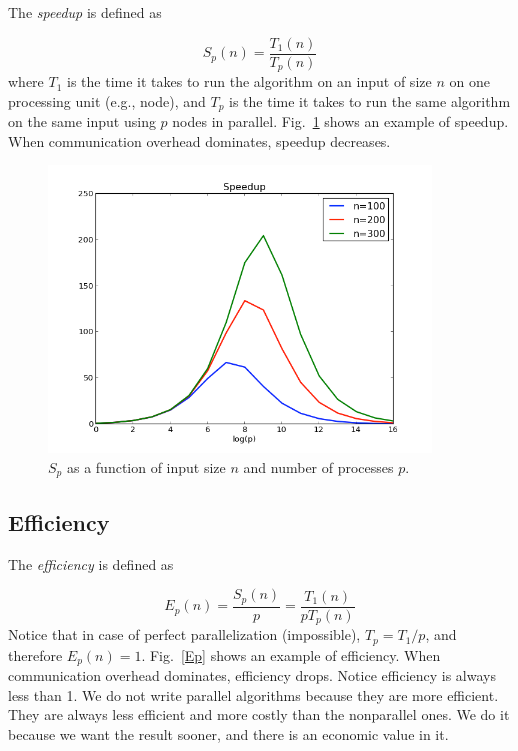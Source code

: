 \documentclass[justified,sixbynine]{tufte-book}
\theoremstyle{plain}%
\theoremstyle{definition}
\theoremstyle{remark}
\begin{document}
\begin{fullwidth}
The {\it speedup} is defined as

\begin{equation}
S_p(n) = \frac{T_1(n)}{T_p(n)}
\end{equation}
where $T_1$ is the time it takes to run the algorithm on an input of size $n$ on one processing unit (e.g., node), and $T_p$ is the time it takes to run the same algorithm on the same input using $p$ nodes in parallel. Fig.~\ref{Sp} shows an example of speedup. When communication overhead dominates, speedup decreases.

\begin{figure}[ht]
\centering\includegraphics[width=4in]{images/Sp.png}
\caption{$S_p$ as a function of input size $n$ and number of processes $p$.\label{Sp}}
\end{figure}

\goodbreak\subsection{Efficiency}

The {\it efficiency} is defined as

\begin{equation}
E_p(n) = \frac{S_p(n)}{p} = \frac{T_1(n)}{p T_p(n)}
\end{equation}
Notice that in case of perfect parallelization (impossible), $T_p=T_1/p$, and therefore $E_p(n)=1$. Fig.~\ref{Ep} shows an example of efficiency. When communication overhead dominates, efficiency drops. Notice efficiency is always less than 1. We do not write parallel algorithms because they are more efficient. They are always less efficient and more costly than the nonparallel ones. We do it because we want the result sooner, and there is an economic value in it.


\end{fullwidth}
\end{document}
